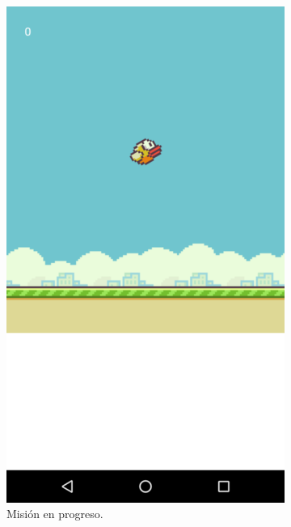 \documentclass[twoside]{report}
\begin{document}
\begin{figure}[H]
\begin{center}
\begin{subfigure}[t]{.3\linewidth}
		\includegraphics[scale=0.2]{images/userguide/29.png}
		\caption{Misión en progreso.}
	\end{subfigure}\hspace{2mm}%
	\begin{subfigure}[t]{.3\linewidth}

\end{subfigure}
\end{center}
\end{figure}
\end{document}
